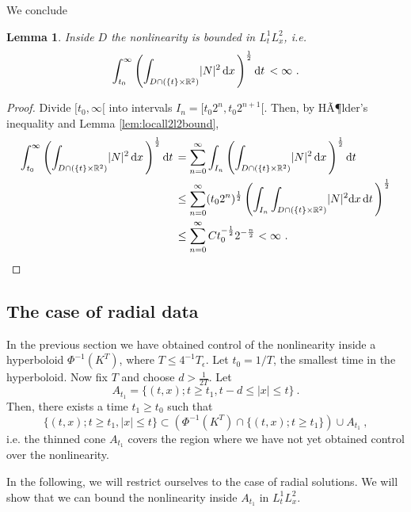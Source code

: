 \documentclass[a4paper]{amsart}
\newtheorem{lemma}[thm]{Lemma}
\providecommand{\abs}[1]{\lvert #1 \rvert}
\providecommand{\dint}[1]{ {\rm d} #1\,}
\begin{document}
We conclude
\begin{lemma}
  Inside $D$ the nonlinearity is bounded in $L_t^1 L_x^2$, i.e.
  \begin{equation*}
    \int_{t_0}^\infty
    \left(
      \int_{D \cap (\{ t \} \times \mathbb{R}^2)}
      \lvert N \rvert^2
      \,
      \dint{x}
    \right)^{\frac{1}{2}}
    \dint{t}
    <
    \infty
    \ .
  \end{equation*}
\end{lemma}
\begin{proof}
  Divide $[t_0, \infty[$ into intervals $I_n = [t_0 2^{n}, t_0 2^{n +
    1}[$. Then, by HÃ¶lder's inequality and Lemma \ref{lem:locall2l2bound},
  \begin{equation*}
    \begin{split}
      \int_{t_0}^\infty
      \left(
        \int_{D \cap (\{ t \} \times \mathbb{R}^2)}
        \lvert N \rvert^2
        \,
        \dint{x}
      \right)^{\frac{1}{2}}
      \dint{t}
      &=
      \sum_{n = 0}^\infty
      \int_{I_n}
      \left(
        \int_{D \cap (\{ t \} \times \mathbb{R}^2)}
        \lvert N \rvert^2
        \,
        \dint{x}
      \right)^{\frac{1}{2}}
      \dint{t}
      \\
      &\leq
      \sum_{n = 0}^\infty
      (t_0 2^{n})^{\frac{1}{2}}
      \left(
        \int_{I_n}
        \int_{D \cap (\{ t \} \times \mathbb{R}^2)}
        \lvert N \rvert^2
        \dint{x}
        \dint{t}
      \right)^{\frac{1}{2}}
      \\
      &\leq
      \sum_{n = 0}^\infty
      C t_0^{-\frac{1}{2}} 2^{-\frac{n}{2}}
      <
      \infty
      \ .
    \end{split}
  \end{equation*}
\end{proof}

\subsection{The case of radial data}

In the previous section we have obtained control of the nonlinearity
inside a hyperboloid $\Phi^{-1}(K^T)$, where  $T \leq 4^{-1}
T_\epsilon$. Let $t_0 = 1 / T$, the smallest
time in the hyperboloid. Now fix $T$ and choose $d > \frac{1}{2T}$.
Let 
\begin{equation*}
  A_{t_1} = \{(t, x); t \geq t_1, t - d \leq \abs{x} \leq t\} \ .
\end{equation*}
Then, there exists a time $t_1 \geq t_0$ such that 
\begin{equation*}
  \{(t, x); t \geq t_1, \abs{x} \leq t\}
  \subset
  \left(
    \Phi^{-1}(K^T) \cap \{(t, x); t \geq t_1\}
  \right)
  \cup
  A_{t_1} \ ,
\end{equation*}
i.e. the thinned cone $A_{t_1}$ covers the region where we have not
yet obtained control over the nonlinearity.
\par
In the following, we will restrict ourselves to the case of radial
solutions. We will show that we can bound the nonlinearity inside
$A_{t_1}$ in $L_t^1 L_x^2$.
\end{document}
